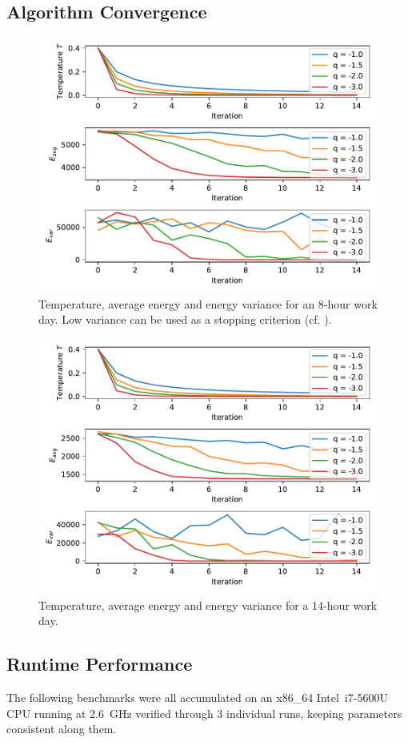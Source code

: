 \documentclass{prettytex/ox/mmsc-special-topic}
\begin{document}
  \subsection{Algorithm Convergence}
  \label{sec:convergence}
  \begin{figure}[H]
    \centering
    \includegraphics[width=0.8\linewidth]{results/convergence-8h-day.pdf}
    \caption{Temperature, average energy and energy variance for an 8-hour work day. Low variance can be used as a stopping criterion (cf. ).}
  \end{figure}
  \begin{figure}[H]
    \centering
    \includegraphics[width=0.8\linewidth]{results/convergence-14h-day.pdf}
    \caption{Temperature, average energy and energy variance for a 14-hour work day.}
  \end{figure}

  \subsection{Runtime Performance}
  \label{sec:runtime}
  The following benchmarks were all accumulated on an x86\_64 Intel\textregistered \, i7-5600U CPU running at \SI{2.6}{\giga\hertz} verified through 3 individual runs, keeping parameters consistent along them.
\end{document}
